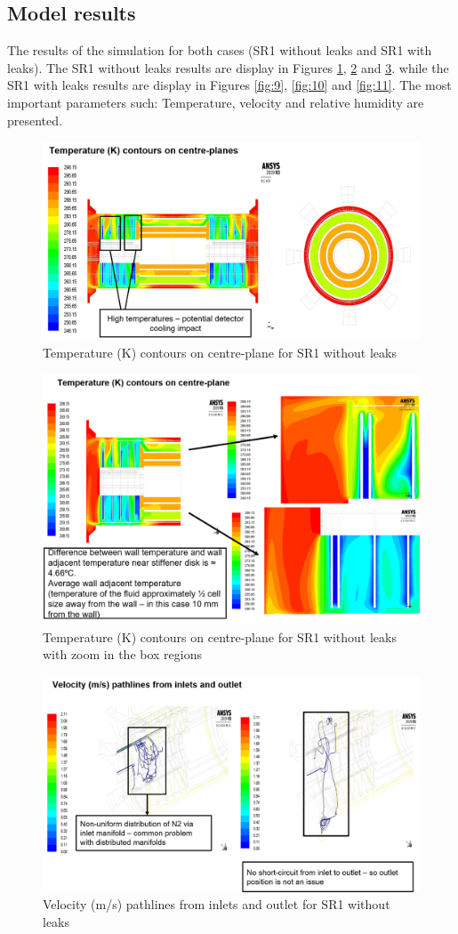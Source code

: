 \documentclass[a4paper]{jpconf}
\begin{document}
\subsection{Model results\label{result}}
The results of the simulation for both cases (SR1 without leaks and  SR1 with leaks). The SR1 without leaks results are display in Figures \ref{fig:6}, \ref{fig:7} and \ref{fig:8}. while the SR1 with leaks results are display in Figures \ref{fig:9}, \ref{fig:10} and \ref{fig:11}. 
The most important parameters such: Temperature, velocity and relative humidity are presented.
\begin{figure}[!h]
\centering
  \includegraphics[width=0.60\linewidth]{Picture20.png}
  \caption{Temperature (K) contours on centre-plane for SR1 without leaks 
}
  \label{fig:6}
\end{figure}

\begin{figure}[!h]
\begin{center}
  \includegraphics[width=0.60\linewidth]{Picture22.png}
  \caption{Temperature (K) contours on centre-plane for SR1 without leaks 
with zoom in the box regions }
  \label{fig:7}
	\end{center}
\end{figure}

\begin{figure}[!h]
\begin{center}
  \includegraphics[width=0.80\linewidth]{Picture23.png}
  \caption{ Velocity (m/s) pathlines from inlets and outlet for SR1 without leaks }
  \label{fig:8}
	\end{center}
\end{figure}
\end{document}
